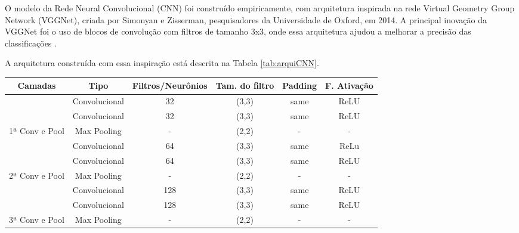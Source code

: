 \documentclass[]{abntex2}
\begin{document}
O modelo da Rede Neural Convolucional (CNN) foi construído empiricamente, com arquitetura inspirada na rede Virtual Geometry Group Network (VGGNet), criada por Simonyan e Zisserman, pesquisadores da Universidade de Oxford, em 2014. A principal inovação da VGGNet foi o uso de blocos de convolução com filtros de tamanho 3x3, onde essa arquitetura ajudou a melhorar a precisão das classificações \cite{simonyan2014very}. 

A arquitetura construída com essa inspiração está descrita na Tabela \ref{tab:arquiCNN}.

\begin{table}[H]
    \centering
    \begin{tabular}{|c|c|c|c|c|c|}
    \hline
    \rowcolor[HTML]{C0C0C0} 
    Camadas                                                  & Tipo          & Filtros/Neurônios & Tam. do filtro & Padding & F. Ativação \\ \hline
    \cellcolor[HTML]{C0C0C0}                                 & Convolucional & 32                   & (3,3)             & same    & ReLU        \\ \cline{2-6} 
    \cellcolor[HTML]{C0C0C0}                                 & Convolucional & 32                   & (3,3)             & same    & ReLU        \\ \cline{2-6} 
    \multirow{-3}{*}{\cellcolor[HTML]{C0C0C0}1ª Conv e Pool} & Max Pooling   & -                    & (2,2)             & -       & -           \\ \hline
    \cellcolor[HTML]{C0C0C0}                                 & Convolucional & 64                   & (3,3)             & same    & ReLu        \\ \cline{2-6} 
    \cellcolor[HTML]{C0C0C0}                                 & Convolucional & 64                   & (3,3)             & same    & ReLU        \\ \cline{2-6} 
    \multirow{-3}{*}{\cellcolor[HTML]{C0C0C0}2ª Conv e Pool} & Max Pooling   & -                    & (2,2)             & -       & -           \\ \hline
    \cellcolor[HTML]{C0C0C0}                                 & Convolucional & 128                  & (3,3)             & same    & ReLU        \\ \cline{2-6} 
    \cellcolor[HTML]{C0C0C0}                                 & Convolucional & 128                  & (3,3)             & same    & ReLU        \\ \cline{2-6} 
    \multirow{-3}{*}{\cellcolor[HTML]{C0C0C0}3ª Conv e Pool} & Max Pooling   & -                    & (2,2)             & -       & -           \\ \hline

\end{tabular}
\end{table}
\end{document}
